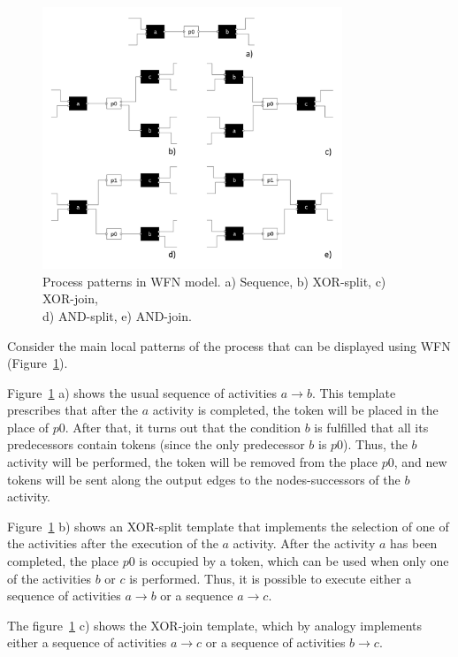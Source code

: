 \documentclass[
11pt,%
tightenlines,%
twoside,%
onecolumn,%
nofloats,%
nobibnotes,%
nofootinbib,%
superscriptaddress,%
noshowpacs,%
centertags]%
{revtex4}
\begin{document}
\begin{figure}[h]
\setcaptionmargin{5mm}
\onelinecaptionsfalse %
\includegraphics[width=0.8\textwidth]{pics/wfn-patterns.pdf}
\caption{Process patterns in WFN model. a) Sequence, b) XOR-split, c) XOR-join,\\d) AND-split, e) AND-join.}
\label{fig:wfn-patterns}
\end{figure}

Consider the main local patterns of the process that can be displayed using WFN (Figure~\ref{fig:wfn-patterns}).

Figure~\ref{fig:wfn-patterns} a) shows the usual sequence of activities $a \rightarrow b$.
This template prescribes that after the $a$ activity is completed, the token will be placed in the place of $p0$.
After that, it turns out that the condition $b$ is fulfilled that all its predecessors contain tokens (since the only predecessor $b$ is $p0$).
Thus, the $b$ activity will be performed, the token will be removed from the place $p0$, and new tokens will be sent along the output edges to the nodes-successors of the $b$ activity.
     
Figure~\ref{fig:wfn-patterns} b) shows an XOR-split template that implements the selection of one of the activities after the execution of the $a$ activity.
After the activity $a$ has been completed, the place $p0$ is occupied by a token, which can be used when only one of the activities $b$ or $c$ is performed.
Thus, it is possible to execute either a sequence of activities $a \rightarrow b$ or a sequence $a \rightarrow c$.

The figure~\ref{fig:wfn-patterns} c) shows the XOR-join template, which by analogy implements either a sequence of activities $a \rightarrow c$ or a sequence of activities $b \rightarrow c$.
\end{document}
